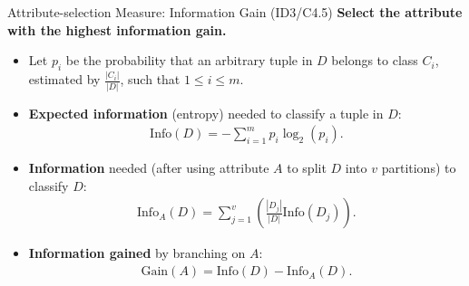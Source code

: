 \begin{frame}{Attribute-selection Measure: Information Gain (ID3/C4.5)}
	\textbf{Select the attribute with the highest information gain.}
	\begin{itemize}
		\item Let $p_i$ be the probability that an arbitrary tuple in $D$ belongs to class $C_i$,\\ estimated by $\frac{|C_i|}{|D|}$, such that $1 \leq i \leq m$.
		\item \textbf{Expected information} (entropy) needed to classify a tuple in $D$:
		      \begin{align}
			      \text{Info}(D) = -\sum_{i=1}^{m}p_i \log_2(p_i).
		      \end{align}
		\item \textbf{Information} needed (after using attribute $A$ to split $D$ into $v$ partitions) to classify $D$:
		      \begin{align}
			      \text{Info}_A(D) = \sum_{j=1}^v \left( \frac{|D_j|}{|D|} \text{Info}(D_j) \right).
		      \end{align}
		\item \textbf{Information gained} by branching on $A$:
		      \begin{align}
			      \text{Gain}(A)=\text{Info}(D)-\text{Info}_A(D).
		      \end{align}
	\end{itemize}
\end{frame}

